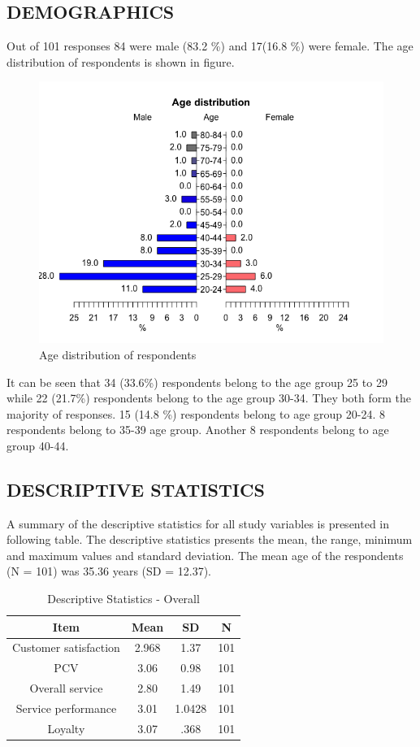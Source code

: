\documentclass[a4paper, 12pt]{extarticle}
\begin{document}
{\subsection{DEMOGRAPHICS}
Out of 101 responses 84 were male (83.2 \%) and 17(16.8 \%) were female. The age distribution of respondents is shown in figure.
\begin{figure}[H]
\centering
\includegraphics[scale=0.7]{age.png}
\caption{Age distribution of respondents}
\end{figure}
It can be seen that 34 (33.6\%) respondents belong to the age group 25 to 29 while 22 (21.7\%) respondents belong to the age group 30-34. They both form the majority of responses. 15 (14.8 \%) respondents belong to age group 20-24. 8 respondents belong to 35-39 age group. Another 8 respondents belong to age group 40-44.

\subsection{DESCRIPTIVE STATISTICS}
A summary of the descriptive statistics for all study variables is presented in following table. The descriptive statistics presents the mean, the range, minimum and maximum values and standard deviation. The mean age of the respondents (N = 101) was 35.36 years (SD = 12.37). 

\begin{table}[H]
\centering
\begin{tabular}{|c|c|c|c|}
\hline
Item & \textbf{Mean} & \textbf{SD} & N \\
\hline
Customer satisfaction & 2.968 & 1.37 & 101 \\
\hline
PCV & 3.06 & 0.98 & 101 \\
\hline
Overall service & 2.80 & 1.49 & 101 \\
\hline
Service performance & 3.01 & 1.0428 & 101 \\
\hline
Loyalty & 3.07 & .368 & 101 \\
\hline
\end{tabular}
\caption{Descriptive Statistics - Overall}
\end{table} 

}
\end{document}
